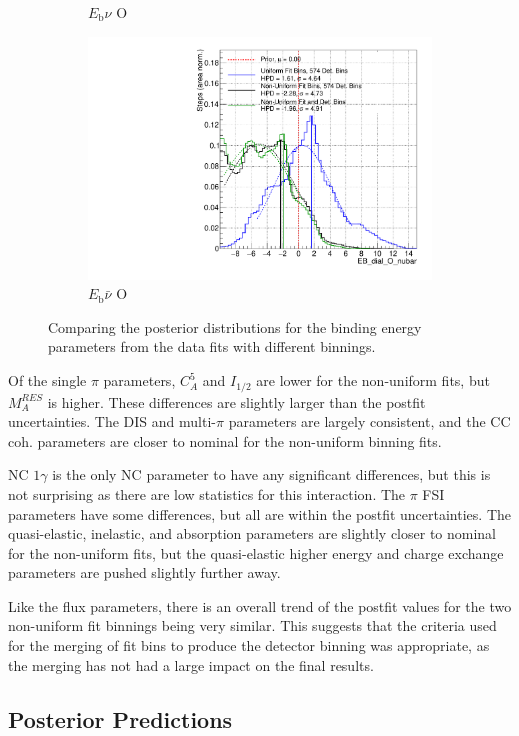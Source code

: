 \begin{figure}
\begin{subfigure}{.48\textwidth}
  \caption{$E_{\mathrm{b}}\nu$ O}\label{fig:polyEbOnu}
\end{subfigure}
\begin{subfigure}{.48\textwidth}
  \centering
  \includegraphics[width=0.73\linewidth]{figs/PolyComp_EB_dial_O_nubar}
  \caption{$E_{\mathrm{b}}\bar{\nu}$ O}
\end{subfigure}
\caption{Comparing the posterior distributions for the binding energy parameters from the data fits with different binnings.}
\label{fig:polyEbdata}
\end{figure}

Of the single $\pi$ parameters, $C_A^{5}$ and $I_{1/2}$ are lower for the non-uniform fits, but $M_A^{RES}$ is higher. These differences are slightly larger than the postfit uncertainties. The DIS and multi-$\pi$ parameters are largely consistent, and the CC coh. parameters are closer to nominal for the non-uniform binning fits.

NC $1\gamma$ is the only NC parameter to have any significant differences, but this is not surprising as there are low statistics for this interaction. The $\pi$ FSI parameters have some differences, but all are within the postfit uncertainties. The quasi-elastic, inelastic, and absorption parameters are slightly closer to nominal for the non-uniform fits, but the quasi-elastic higher energy and charge exchange parameters are pushed slightly further away.

Like the flux parameters, there is an overall trend of the postfit values for the two non-uniform fit binnings being very similar. This suggests that the criteria used for the merging of fit bins to produce the detector binning was appropriate, as the merging has not had a large impact on the final results. 

\subsection{Posterior Predictions}

